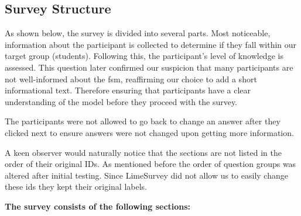 \subsection{Survey Structure}

As shown below, the survey is divided into several parts. Most noticeable, information about the participant is collected to determine if they fall within our target group (students). Following this, the participant's level of knowledge is assessed. This question later confirmed our suspicion that many participants are not well-informed about the \gls{fsm}, reaffirming our choice to add a short informational text. Therefore ensuring that participants have a clear understanding of the model before they proceed with the survey. 

The participants were not allowed to go back to change an answer after they clicked next to ensure answers were not changed upon getting more information.

A keen observer would naturally notice that the sections are not listed in the order of their original IDs. As mentioned before the order of question groups was altered after initial testing. Since LimeSurvey did not allow us to easily change these ids they kept their original labels.

\textbf{The survey consists of the following sections:}

